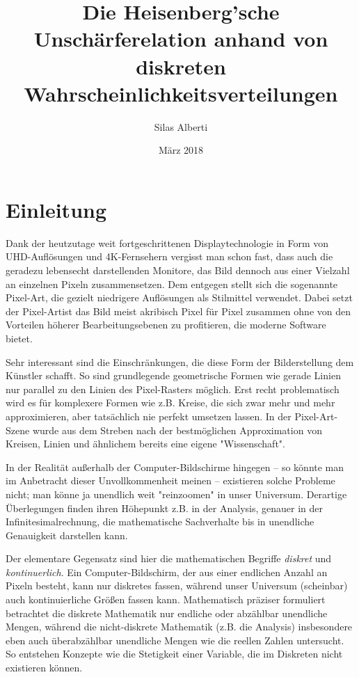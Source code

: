 \documentclass[a4paper,12pt,ngerman]{scrartcl}
\title{Die Heisenberg'sche Unschärferelation anhand von diskreten Wahrscheinlichkeitsverteilungen}
\author{Silas Alberti}
\date{März 2018}
\theoremstyle{plain}
\theoremstyle{plain}
\theoremstyle{plain}
\theoremstyle{plain}
\begin{document}
\maketitle

\tableofcontents

\thispagestyle{empty}
\clearpage
\setcounter{page}{1}

\section{Einleitung}

Dank der heutzutage weit fortgeschrittenen Displaytechnologie in Form von UHD-Auflösungen und 4K-Fernsehern vergisst man schon fast, dass auch die geradezu lebensecht darstellenden Monitore, das Bild dennoch aus einer Vielzahl an einzelnen Pixeln zusammensetzen. Dem entgegen stellt sich die sogenannte Pixel-Art, die gezielt niedrigere Auflösungen als Stilmittel verwendet. Dabei setzt der Pixel-Artist das Bild meist akribisch Pixel für Pixel zusammen ohne von den Vorteilen höherer Bearbeitungsebenen zu profitieren, die moderne Software bietet.


Sehr interessant sind die Einschränkungen, die diese Form der Bilderstellung dem Künstler schafft. So sind grundlegende geometrische Formen wie gerade Linien nur parallel zu den Linien des Pixel-Rasters möglich. Erst recht problematisch wird es für komplexere Formen wie z.B. Kreise, die sich zwar mehr und mehr approximieren, aber tatsächlich nie perfekt umsetzen lassen. In der Pixel-Art-Szene wurde aus dem Streben nach der bestmöglichen Approximation von Kreisen, Linien und ähnlichem bereits eine eigene "Wissenschaft".


In der Realität außerhalb der Computer-Bildschirme hingegen -- so könnte man im Anbetracht dieser Unvollkommenheit meinen -- existieren solche Probleme nicht; man könne ja unendlich weit "reinzoomen" in unser Universum. Derartige Überlegungen finden ihren Höhepunkt z.B. in der Analysis, genauer in der Infinitesimalrechnung, die mathematische Sachverhalte bis in unendliche Genauigkeit darstellen kann. 

Der elementare Gegensatz sind hier die mathematischen Begriffe \textit{diskret} und \textit{kontinuerlich}. Ein Computer-Bildschirm, der aus einer endlichen Anzahl an Pixeln besteht, kann nur diskretes fassen, während unser Universum (scheinbar) auch kontinuierliche Größen fassen kann. Mathematisch präziser formuliert betrachtet die diskrete Mathematik nur endliche oder abzählbar unendliche Mengen, während die nicht-diskrete Mathematik (z.B. die Analysis) insbesondere eben auch überabzählbar unendliche Mengen wie die reellen Zahlen untersucht. So entstehen Konzepte wie die Stetigkeit einer Variable, die im Diskreten nicht existieren können.
\end{document}
